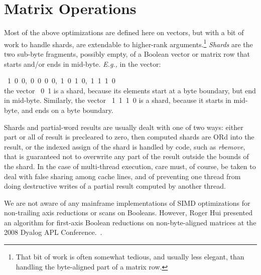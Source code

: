 \section{Matrix Operations}
\label{matrixoperations}

Most of the above optimizations are defined here on vectors, but with
a bit of work to handle shards, are
extendable to higher-rank arguments.\footnote{That 
bit of work is often somewhat tedious, and usually less elegant,
than handling the byte-aligned part of a matrix row.}
{\em Shards} are the two sub-byte fragments, possibly empty, of a 
Boolean vector or matrix row that starts and/or ends in mid-byte. 
{\em E.g.,} in the vector:

\medskip
{~1~0~0,~0~0~0~0,~1~0~1~0,~1~1~1~0}\\

\noindent the vector {~0~1} is a shard, because its 
elements start at a byte boundary, but end in mid-byte.
Similarly, the vector {~1~1~1~0} is a shard, because 
it starts in mid-byte, and ends on a byte boundary.

Shards and partial-word results are usually dealt with one of
two ways: either part or all of result is precleared to zero, then 
computed shards are ORd into the result, or the indexed
assign of the shard is handled by code, such as {\em rbemove}, 
that is guaranteed not to overwrite any part of the result
outside the bounds of the shard.
In the case of multi-thread execution, care must, of course, be taken
to deal with false sharing among cache lines, and of preventing
one thread from doing destructive writes of a partial result 
computed by another thread.

We are not aware of any mainframe implementations of SIMD optimizations
for non-trailing axis reductions or scans on Booleans.
However, Roger Hui presented an algorithm for first-axis Boolean reductions on 
non-byte-aligned matrices at the 2008 Dyalog APL 
Conference.~\cite{RHui:bitarrays}.



